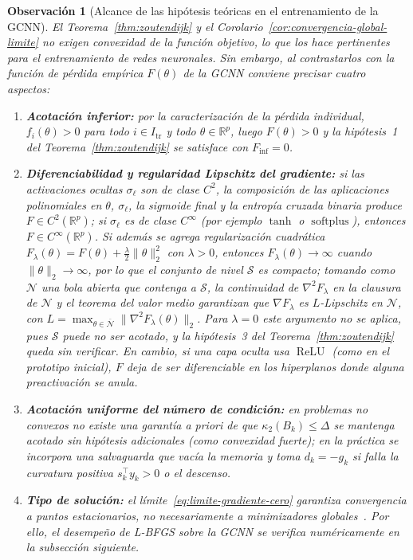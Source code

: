 \documentclass[a4paper,openany,oneside,10pt]{report}
\theoremstyle{pnlTeorema}
\theoremstyle{pnlDefinicion}
\theoremstyle{pnlObservacion}
\newtheorem{observacion}{Observación}[section]
\begin{document}
\begin{observacion}[Alcance de las hipótesis teóricas en el entrenamiento de la GCNN]
\label{obs:hipotesis-gcnn-lbfgs}
El Teorema~\ref{thm:zoutendijk} y el Corolario~\ref{cor:convergencia-global-limite}
\emph{no} exigen convexidad de la función objetivo, lo que los hace pertinentes
para el entrenamiento de redes neuronales. Sin embargo, al contrastarlos con la
función de pérdida empírica $F(\theta)$ de la GCNN conviene precisar cuatro
aspectos:
\begin{enumerate}
\item \textbf{Acotación inferior:} por la caracterización de la pérdida
individual, $f_i(\theta)>0$ para todo $i\in I_{\mathrm{tr}}$ y todo
$\theta\in\mathbb{R}^p$, luego $F(\theta)>0$ y la hipótesis~1 del
Teorema~\ref{thm:zoutendijk} se satisface con $F_{\inf}=0$.
\item \textbf{Diferenciabilidad y regularidad Lipschitz del gradiente:} si las
activaciones ocultas $\sigma_\ell$ son de clase $C^2$, la composición de las
aplicaciones polinomiales en $\theta$, $\sigma_\ell$, la sigmoide final y la
entropía cruzada binaria produce $F\in C^2(\mathbb{R}^p)$; si $\sigma_\ell$ es de
clase $C^\infty$ (por ejemplo $\tanh$ o $\operatorname{softplus}$), entonces
$F\in C^\infty(\mathbb{R}^p)$.
Si además se agrega regularización cuadrática
$F_\lambda(\theta)=F(\theta)+\frac{\lambda}{2}\|\theta\|_2^2$ con $\lambda>0$,
entonces $F_\lambda(\theta)\to\infty$ cuando $\|\theta\|_2\to\infty$, por lo que
el conjunto de nivel $\mathcal{S}$ es compacto; tomando como $\mathcal{N}$ una bola
abierta que contenga a $\mathcal{S}$, la continuidad de $\nabla^2 F_\lambda$ en la
clausura de $\mathcal{N}$ y el teorema del valor medio garantizan que
$\nabla F_\lambda$ es $L$-Lipschitz en $\mathcal{N}$, con
$L=\max_{\theta\in\overline{\mathcal{N}}}\|\nabla^2F_\lambda(\theta)\|_2$. Para
$\lambda=0$ este argumento no se aplica, pues $\mathcal{S}$ puede no ser acotado,
y la hipótesis~3 del Teorema~\ref{thm:zoutendijk} queda sin verificar. En cambio, si una capa oculta usa $\operatorname{ReLU}$
(como en el prototipo inicial), $F$ deja de ser
diferenciable en los hiperplanos donde alguna preactivación se anula.
\item \textbf{Acotación uniforme del número de condición:} en problemas no
convexos no existe una garantía \emph{a priori} de que $\kappa_2(B_k)\le\Delta$
se mantenga acotado sin hipótesis adicionales (como convexidad fuerte); en la
práctica se incorpora una salvaguarda que vacía la memoria y toma $d_k=-g_k$ si
falla la curvatura positiva $s_k^\top y_k>0$ o el descenso.
\item \textbf{Tipo de solución:} el límite~\eqref{eq:limite-gradiente-cero}
garantiza convergencia a puntos estacionarios, no necesariamente a minimizadores
globales~\cite[p.~99]{andrei2020}. Por ello, el desempeño de L-BFGS sobre la GCNN
se verifica numéricamente en la subsección siguiente.
\end{enumerate}
\end{observacion}
\end{document}
